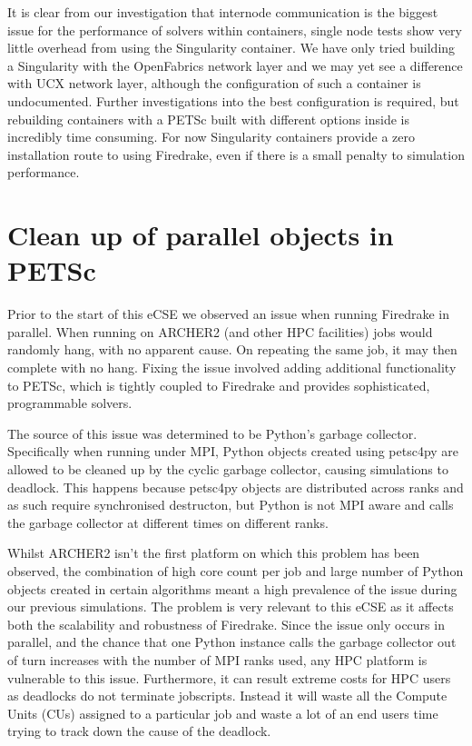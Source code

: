 \documentclass[a4paper,11pt]{article}
\begin{document}
It is clear from our investigation that internode communication is the biggest issue for the performance of solvers within containers, single node tests show very little overhead from using the Singularity container.
We have only tried building a Singularity with the OpenFabrics network layer and we may yet see a difference with UCX network layer, although the configuration of such a container is undocumented.
Further investigations into the best configuration is required, but rebuilding containers with a PETSc built with different options inside is incredibly time consuming.
For now Singularity containers provide a zero installation route to using Firedrake, even if there is a small penalty to simulation performance.


\section{Clean up of parallel objects in PETSc}
\label{sec:other}
Prior to the start of this eCSE we observed an issue when running Firedrake in parallel.
When running on ARCHER2 (and other HPC facilities) jobs would randomly hang, with no apparent cause.
On repeating the same job, it may then complete with no hang.
Fixing the issue involved adding additional functionality to PETSc, which is tightly coupled to Firedrake and provides sophisticated, programmable solvers\cite{petsc}.

The source of this issue was determined to be Python's garbage collector.
Specifically when running under MPI, Python objects created using petsc4py are allowed to be cleaned up by the cyclic garbage collector, causing simulations to deadlock.
This happens because petsc4py objects are distributed across ranks and as such require synchronised destructon, but Python is not MPI aware and calls the garbage collector at different times on different ranks.

Whilst ARCHER2 isn't the first platform on which this problem has been observed, the combination of high core count per job and large number of Python objects created in certain algorithms meant a high prevalence of the issue during our previous simulations.
The problem is very relevant to this eCSE as it affects both the scalability and robustness of Firedrake.
Since the issue only occurs in parallel, and the chance that one Python instance calls the garbage collector out of turn increases with the number of MPI ranks used, any HPC platform is vulnerable to this issue.
Furthermore, it can result extreme costs for HPC users as deadlocks do not terminate jobscripts.
Instead it will waste all the Compute Units (CUs) assigned to a particular job and waste a lot of an end users time trying to track down the cause of the deadlock.
\end{document}
